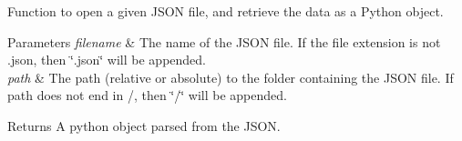 Function to open a given J\+S\+ON file, and retrieve the data as a Python object. 


\begin{DoxyParams}{Parameters}
{\em filename} & The name of the J\+S\+ON file. If the file extension is not .json, then \char`\"{}.\+json\char`\"{} will be appended. \\
\hline
{\em path} & The path (relative or absolute) to the folder containing the J\+S\+ON file. If path does not end in /, then \char`\"{}/\char`\"{} will be appended. \\
\hline
\end{DoxyParams}
\begin{DoxyReturn}{Returns}
A python object parsed from the J\+S\+ON. 
\end{DoxyReturn}
